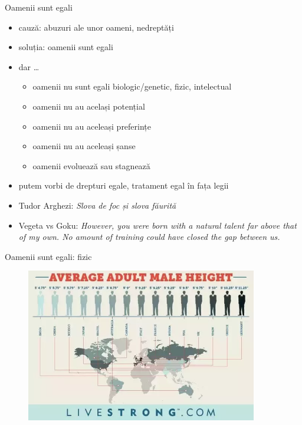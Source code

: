 \documentclass{beamer}
\begin{document}
\begin{frame}{Oamenii sunt egali}
  \begin{itemize}
    \pause \item cauză: abuzuri ale unor oameni, nedreptăți
    \pause \item soluția: oamenii sunt egali
    \pause \item dar \ldots
      \begin{itemize}
        \pause \item oamenii nu sunt egali biologic/genetic, fizic, intelectual
        \pause \item oamenii nu au același potențial
        \pause \item oamenii nu au aceleași preferințe
        \pause \item oamenii nu au aceleași șanse
        \pause \item oamenii evoluează sau stagnează
      \end{itemize}
    \pause \item putem vorbi de drepturi egale, tratament egal în fața legii
    \pause \item Tudor Arghezi: \textit{Slova de foc și slova făurită}
    \pause \item Vegeta vs Goku: \textit{However, you were born with a natural talent far above that of my own. No amount of training could have closed the gap between us.}
  \end{itemize}
\end{frame}

\begin{frame}{Oamenii sunt egali: fizic}
  \centering
  \begin{figure}
    \includegraphics[width=0.9\textwidth]{img/male-height}
  \end{figure}
\end{frame}
\end{document}
